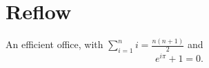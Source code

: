 \documentclass{article}
\begin{document}
\section{Reflow}
An efficient office, with $\sum_{i=1}^n i = \frac{n(n+1)}{2}$ and
\begin{equation} e^{i\pi} + 1 = 0. \end{equation}
\end{document}
